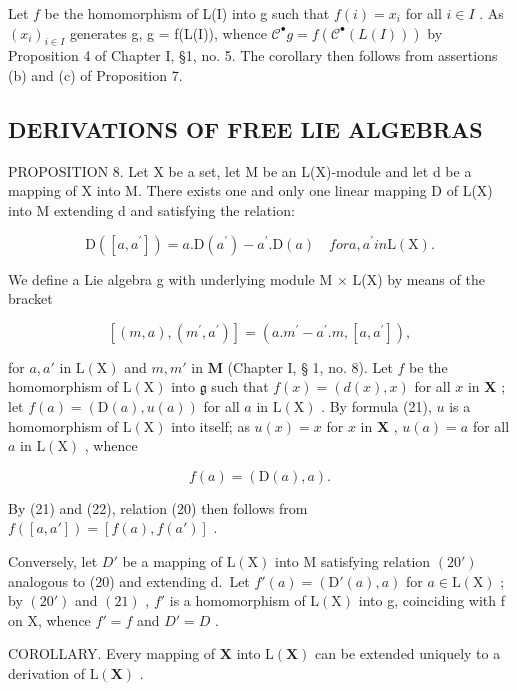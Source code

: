 Let \(f\) be the homomorphism of L(I) into g such that \(f(i) = x_i\) for all \(i \in I\) . As \((x_i)_{i \in I}\) generates g, g = f(L(I)), whence \(\mathcal{C}^{\bullet}g = f(\mathcal{C}^{\bullet}(L(I)))\) by Proposition 4 of Chapter I, §1, no. 5. The corollary then follows from assertions (b) and (c) of Proposition 7.

\subsection{DERIVATIONS OF FREE LIE ALGEBRAS}

PROPOSITION 8. Let X be a set, let M be an L(X)-module and let d be a mapping of X into M. There exists one and only one linear mapping D of L(X) into M extending d and satisfying the relation:

\[
\mathrm{D} ([ a, a ^ {\prime} ]) = a. \mathrm{D} (a ^ {\prime}) - a ^ {\prime}. \mathrm{D} (a) \quad for a, a ^ {\prime} in \mathrm{L} (\mathrm{X}).\tag{20}
\]

We define a Lie algebra g with underlying module M × L(X) by means of the bracket

\[
[ (m, a), (m ^ {\prime}, a ^ {\prime}) ] = (a. m ^ {\prime} - a ^ {\prime}. m, [ a, a ^ {\prime} ]),\tag{21}
\]

for \(a, a'\) in \(\mathrm{L}(\mathrm{X})\) and \(m, m'\) in \(\mathbf{M}\) (Chapter I, § 1, no. 8). Let \(f\) be the homomorphism of \(\mathrm{L}(\mathrm{X})\) into \(\mathfrak{g}\) such that \(f(x) = (d(x), x)\) for all \(x\) in \(\mathbf{X}\) ; let \(f(a) = (\mathrm{D}(a), u(a))\) for all \(a\) in \(\mathrm{L}(\mathrm{X})\) . By formula (21), \(u\) is a homomorphism of \(\mathrm{L}(\mathrm{X})\) into itself; as \(u(x) = x\) for \(x\) in \(\mathbf{X}\) , \(u(a) = a\) for all \(a\) in \(\mathrm{L}(\mathrm{X})\) , whence

\[
f (a) = (\mathrm{D} (a), a).\tag{22}
\]

By (21) and (22), relation (20) then follows from \(f([a, a']) = [f(a), f(a')]\) .

Conversely, let \(D'\) be a mapping of \(\mathrm{L}(\mathrm{X})\) into M satisfying relation \((20')\) analogous to (20) and extending d.~Let \(f'(a) = (\mathrm{D}'(a), a)\) for \(a \in \mathrm{L}(\mathrm{X})\) ; by \((20')\) and \((21)\) , \(f'\) is a homomorphism of \(\mathrm{L}(\mathrm{X})\) into g, coinciding with f on X, whence \(f' = f\) and \(D' = D\) .

COROLLARY. Every mapping of \(\mathbf{X}\) into \(\mathrm{L}(\mathbf{X})\) can be extended uniquely to a derivation of \(\mathrm{L}(\mathbf{X})\) .

